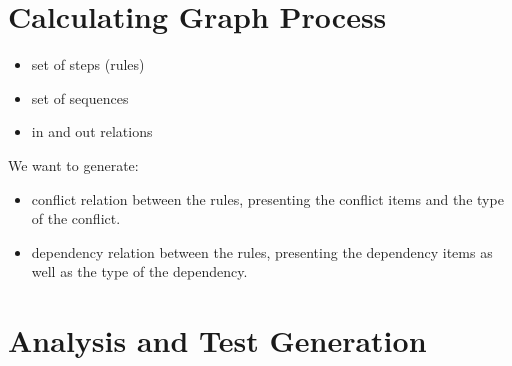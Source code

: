 \section{Calculating Graph Process}

\begin{itemize}
\item set of steps (rules)
\item set of sequences
\item in and out relations
\end{itemize}

We want to generate:

\begin{itemize}
\item conflict relation between the rules, presenting the conflict items and the type of the conflict.
\item dependency relation between the rules, presenting the dependency items as well as the type of the dependency.
\end{itemize}
\begin{definition}
\end{definition}

\section{Analysis and Test Generation}






